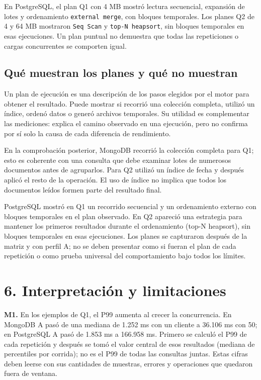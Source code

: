\documentclass[12pt,letterpaper]{article}
\begin{document}
En PostgreSQL, el plan Q1 con 4 MB mostró lectura secuencial, expansión de lotes y ordenamiento \texttt{external merge}, con bloques temporales. Los planes Q2 de 4 y 64 MB mostraron \texttt{Seq Scan} y \texttt{top-N heapsort}, sin bloques temporales en esas ejecuciones. Un plan puntual no demuestra que todas las repeticiones o cargas concurrentes se comporten igual.


\subsection*{Qué muestran los planes y qué no muestran}
Un plan de ejecución es una descripción de los pasos elegidos por el motor para obtener el resultado. Puede mostrar si recorrió una colección completa, utilizó un índice, ordenó datos o generó archivos temporales. Su utilidad es complementar las mediciones: explica el camino observado en una ejecución, pero no confirma por sí solo la causa de cada diferencia de rendimiento.

En la comprobación posterior, MongoDB recorrió la colección completa para Q1; esto es coherente con una consulta que debe examinar lotes de numerosos documentos antes de agruparlos. Para Q2 utilizó un índice de fecha y después aplicó el resto de la operación. El uso de índice no implica que todos los documentos leídos formen parte del resultado final.

PostgreSQL mostró en Q1 un recorrido secuencial y un ordenamiento externo con bloques temporales en el plan observado. En Q2 apareció una estrategia para mantener los primeros resultados durante el ordenamiento (top-N heapsort), sin bloques temporales en esas ejecuciones. Los planes se capturaron después de la matriz y con perfil A; no se deben presentar como si fueran el plan de cada repetición o como prueba universal del comportamiento bajo todos los límites.

\section*{6. Interpretación y limitaciones}
\textbf{M1.} En los ejemplos de Q1, el P99 aumenta al crecer la concurrencia. En MongoDB A pasó de una mediana de 1.252 ms con un cliente a 36.106 ms con 50; en PostgreSQL A pasó de 1.853 ms a 166.958 ms. Primero se calculó el P99 de cada repetición y después se tomó el valor central de esos resultados (mediana de percentiles por corrida); no es el P99 de todas las consultas juntas. Estas cifras deben leerse con sus cantidades de muestras, errores y operaciones que quedaron fuera de ventana.
\end{document}
